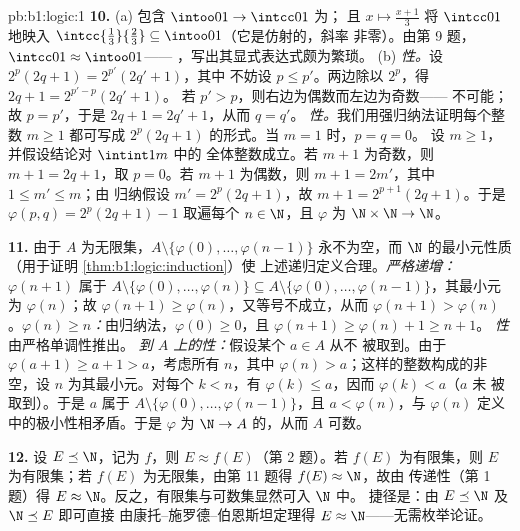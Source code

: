 \begin{solution}{pb:b1:logic:1}
\textbf{10.} (a) 包含 $\intoo01 \to \intcc01$ 为；
且 $x \mapsto \frac{x + 1}3$ 将 $\intcc01$ 地映入
$\intcc{\frac13}{\frac23} \subseteq \intoo01$（它是仿射的，斜率
非零）。由第 9 题，$\intcc01 \approx \intoo01$——
，写出其显式表达式颇为繁琐。
(b) \emph{性。}设 $2^p(2q + 1) = 2^{p'}(2q' + 1)$，其中
不妨设 $p \leq p'$。两边除以 $2^p$，得 $2q + 1 = 2^{p' - p}(2q' + 1)$。
若 $p' > p$，则右边为偶数而左边为奇数——
不可能；故 $p = p'$，于是 $2q + 1 = 2q' + 1$，从而 $q = q'$。
\emph{性。}我们用强归纳法证明每个整数
$m \geq 1$ 都可写成 $2^p(2q + 1)$ 的形式。当 $m = 1$ 时，$p = q = 0$。
设 $m \geq 1$，并假设结论对 $\intint1m$ 中的
全体整数成立。若 $m + 1$ 为奇数，则 $m + 1 = 2q + 1$，取 $p = 0$。若
$m + 1$ 为偶数，则 $m + 1 = 2m'$，其中 $1 \leq m' \leq m$；由
归纳假设 $m' = 2^p(2q + 1)$，故 $m + 1 = 2^{p+1}(2q + 1)$。于是
$\varphi(p, q) = 2^p(2q + 1) - 1$ 取遍每个 $n \in \N$，且
$\varphi$ 为 $\N \times \N \to \N$。

\textbf{11.} 由于 $A$ 为无限集，$A \setminus \{\varphi(0), \dots,
\varphi(n - 1)\}$ 永不为空，而
$\N$ 的最小元性质（用于证明 \cref{thm:b1:logic:induction}）使
上述递归定义合理。\emph{严格递增：}
$\varphi(n + 1)$ 属于 $A \setminus \{\varphi(0), \dots,
\varphi(n)\} \subseteq A \setminus \{\varphi(0), \dots, \varphi(n -
1)\}$，其最小元为 $\varphi(n)$；故 $\varphi(n + 1) \geq
\varphi(n)$，又等号不成立，从而 $\varphi(n+1) >
\varphi(n)$。\emph{$\varphi(n) \geq n$：}由归纳法，$\varphi(0)
\geq 0$，且 $\varphi(n + 1) \geq \varphi(n) + 1 \geq n + 1$。
\emph{性}由严格单调性推出。
\emph{到 $A$ 上的性：}假设某个 $a \in A$ 从不
被取到。由于 $\varphi(a + 1) \geq a + 1 > a$，考虑所有 $n$，其中
$\varphi(n) > a$；这样的整数构成的非空，设 $n$ 为其最小元。对每个
$k < n$，有 $\varphi(k) \leq a$，因而 $\varphi(k) < a$（$a$ 未
被取到）。于是 $a$ 属于 $A \setminus \{\varphi(0), \dots,
\varphi(n - 1)\}$，且 $a < \varphi(n)$，与
$\varphi(n)$ 定义中的极小性相矛盾。于是 $\varphi$ 为 $\N \to A$ 的，从而
$A$ 可数。

\textbf{12.} 设 $E \preceq \N$，记为 $f$，则 $E \approx
f(E)$（第 2 题）。若 $f(E)$ 为有限集，则 $E$ 为有限集；若 $f(E)$
为无限集，由第 11 题得 $f(E) \approx \N$，故由
传递性（第 1 题）得 $E \approx \N$。反之，有限集与可数集显然可入 $\N$ 中。
捷径是：由 $E \preceq \N$ 及 $\N
\preceq E$ 即可直接
由康托–施罗德–伯恩斯坦定理得 $E \approx \N$——无需枚举论证。


\end{solution}
